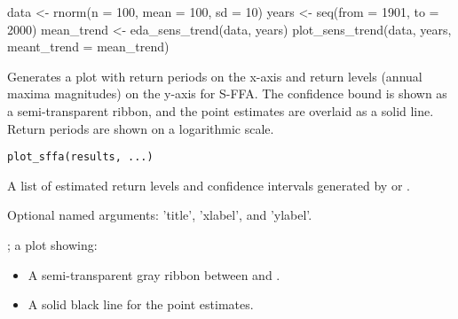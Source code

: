 \documentclass[a4paper]{book}
\begin{document}
%
\begin{SeeAlso}
\end{SeeAlso}
%
\begin{Examples}
\begin{ExampleCode}
data <- rnorm(n = 100, mean = 100, sd = 10)
years <- seq(from = 1901, to = 2000)
mean_trend <- eda_sens_trend(data, years)
plot_sens_trend(data, years, meant_trend = mean_trend)

\end{ExampleCode}
\end{Examples}
%
\begin{Description}
Generates a plot with return periods on the x-axis and return levels (annual
maxima magnitudes) on the y-axis for S-FFA. The confidence bound is shown as a
semi-transparent ribbon, and the point estimates are overlaid as a solid line.
Return periods are shown on a logarithmic scale.
\end{Description}
%
\begin{Usage}
\begin{verbatim}
plot_sffa(results, ...)
\end{verbatim}
\end{Usage}
%
\begin{Arguments}
\begin{ldescription}
\item[\code{results}] A list of estimated return levels and confidence intervals
generated by  or .

\item[\code{...}] Optional named arguments: 'title', 'xlabel', and 'ylabel'.
\end{ldescription}
\end{Arguments}
%
\begin{Value}
; a plot showing:
\begin{itemize}

\item{} A semi-transparent gray ribbon between  and .
\item{} A solid black line for the point estimates.

\end{itemize}

\end{Value}
\end{document}
